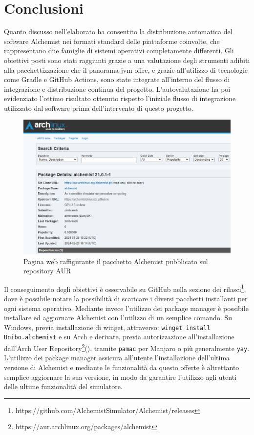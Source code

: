 
\chapter{Conclusioni}
Quanto discusso nell'elaborato ha consentito la distribuzione automatica del software Alchemist nei formati standard delle piattaforme coinvolte, che rappresentano due famiglie di sistemi operativi completamente differenti. Gli obiettivi posti sono stati raggiunti grazie a una valutazione degli strumenti adibiti alla pacchettizzazione che il panorama \ac{jvm} offre, e grazie all'utilizzo di tecnologie come Gradle e GitHub Actions, sono state integrate all'interno del flusso di integrazione e distribuzione continua del progetto. L'autovalutazione ha poi evidenziato l'ottimo risultato ottenuto rispetto l'iniziale flusso di integrazione utilizzato dal software prima dell'intervento di questo progetto.

\begin{figure}[htb]
	\centering
	\includegraphics[width=.8\linewidth]{figures/alchemist-aur.png}
	\caption{Pagina web raffigurante il pacchetto Alchemist pubblicato sul repository AUR}
	\label{fig:aur-web}
\end{figure}

Il conseguimento degli obiettivi è osservabile su GitHub nella sezione dei rilasci\footnote{https://github.com/AlchemistSimulator/Alchemist/releases}, dove è possibile notare la possibilità di scaricare i diversi pacchetti installanti per ogni sistema operativo. Mediante invece l'utilizzo dei package manager è possibile installare ed aggiornare Alchemist con l'utilizzo di un semplice comando. Su Windows, previa installazione di winget, attraverso:
\texttt{winget install Unibo.alchemist}
e su Arch e derivate, previa autorizzazione all'installazione dall'Arch User Repository\footnote{https://aur.archlinux.org/packages/alchemist}(), tramite \texttt{pamac} per Manjaro o più generalmente \texttt{yay}.
L'utilizzo dei package manager assicura all'utente l'installazione dell'ultima versione di Alchemist e mediante le funzionalità da questo offerte è altrettanto semplice aggiornare la sua versione, in modo da garantire l'utilizzo agli utenti delle ultime funzionalità del simulatore. 

